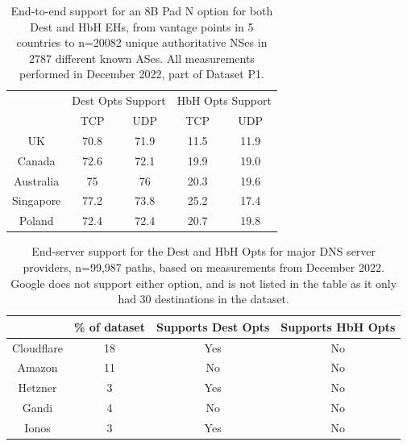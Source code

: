 \documentclass[conference]{IEEEtran}
\begin{document}
\begin{table}[]
\begin{tabular}{c|cc|cc}
\multicolumn{1}{l|}{} & \multicolumn{2}{c|}{Dest Opts Support} & \multicolumn{2}{c}{HbH Opts Support} \\ \cline{2-5} 
\multicolumn{1}{l|}{} & \multicolumn{1}{c|}{TCP}       & UDP      & \multicolumn{1}{c|}{TCP}     & UDP     \\ \hline
UK                    & \multicolumn{1}{c|}{70.8}      & 71.9     & \multicolumn{1}{c|}{11.5}    & 11.9    \\ \hline
Canada                & \multicolumn{1}{c|}{72.6}      & 72.1     & \multicolumn{1}{c|}{19.9}    & 19.0    \\ \hline
Australia             & \multicolumn{1}{c|}{75}        & 76       & \multicolumn{1}{c|}{20.3}    & 19.6    \\ \hline
Singapore             & \multicolumn{1}{c|}{77.2}      & 73.8     & \multicolumn{1}{c|}{25.2}    & 17.4    \\ \hline
Poland                & \multicolumn{1}{c|}{72.4}      & 72.4     & \multicolumn{1}{c|}{20.7}    & 19.8   
\end{tabular}
\label{tbl:e2e_traversal}
\caption{End-to-end support for an 8B Pad N option for both Dest and HbH EHs, from vantage points in 5 countries to n=20082 unique authoritative NSes in 2787 different known ASes. All measurements performed in December 2022, part of Dataset P1.}
\end{table}

\begin{table}[]
\begin{tabular}{c|c|c|c}
           & \% of dataset & Supports Dest Opts & Supports HbH Opts \\
\hline
Cloudflare & 18                      & Yes                & No                 \\
\hline
Amazon     & 11                     & No                 & No                 \\
\hline
Hetzner    & 3                     & Yes                & No                 \\
\hline
Gandi      & 4                     & No                 & No                 \\
\hline
Ionos      & 3                    & Yes                & No                
\end{tabular}
\label{tbl:provider_support}
\caption{End-server support for the Dest and HbH Opts for major DNS server providers, n=99,987 paths, based on measurements from December 2022. Google does not support either option, and is not listed in the table as it only had 30 destinations in the dataset.
}
\end{table}
\end{document}
